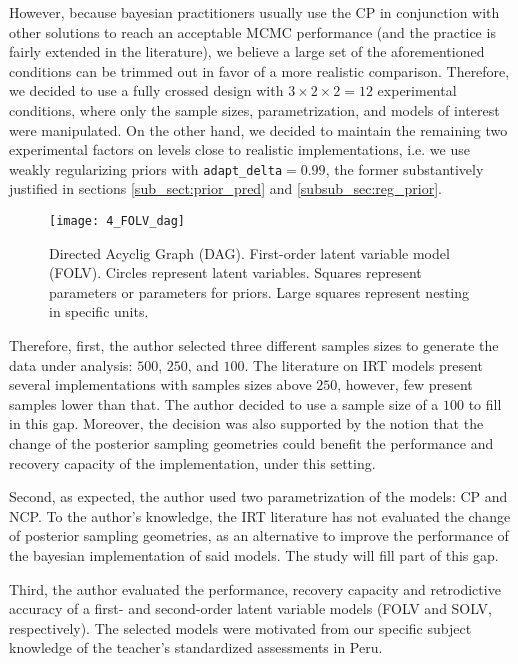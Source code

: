 However, because bayesian practitioners usually use the CP in conjunction with other solutions to reach an acceptable MCMC performance (and the practice is fairly extended in the literature), we believe a large set of the aforementioned conditions can be trimmed out in favor of a more realistic comparison. Therefore, we decided to use a fully crossed design with $3 \times 2 \times 2 = 12$ experimental conditions, where only the sample sizes, parametrization, and models of interest were manipulated. On the other hand, we decided to maintain the remaining two experimental factors on levels close to realistic implementations, i.e. we use weakly regularizing priors with \texttt{adapt\_delta}$=0.99$, the former substantively justified in sections \ref{sub_sect:prior_pred} and \ref{subsub_sec:reg_prior}.
%
\begin{figure}[H]
	\centering
	\texttt{[image: 4\_FOLV\_dag]}
	\caption[Directed Acyclig Graph (DAG). First-order latent variable model (FOLV).]%
	{Directed Acyclig Graph (DAG). First-order latent variable model (FOLV). Circles represent latent variables. Squares represent parameters or parameters for priors. Large squares represent nesting in specific units.}
	\label{fig:FOLV_model}
\end{figure}

Therefore, first, the author selected three different samples sizes to generate the data under analysis: $500$, $250$, and $100$. The literature on IRT models present several implementations with samples sizes above $250$, however, few present samples lower than that. The author decided to use a sample size of a $100$ to fill in this gap. Moreover, the decision was also supported by the notion that the change of the posterior sampling geometries could benefit the performance and recovery capacity of the implementation, under this setting.

Second, as expected, the author used two parametrization of the models: CP and NCP. To the author's knowledge, the IRT literature has not evaluated the change of posterior sampling geometries, as an alternative to improve the performance of the bayesian implementation of said models. The study will fill part of this gap.

Third, the author evaluated the performance, recovery capacity and retrodictive accuracy of a first- and second-order latent variable models (FOLV and SOLV, respectively). The selected models were motivated from our specific subject knowledge of the teacher's standardized assessments in Peru.

